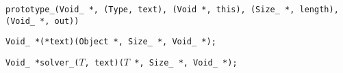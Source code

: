 
\tt{prototype_(Void_ *, (Type, text), (Void *, this), (Size_ *, length), (Void_ *, out))}


\tt{Void_ *(*text)(Object *, Size_ *, Void_ *);}


\tt{Void_ *solver_(}$T$\tt{, text)(}$T$ \tt{*, Size_ *, Void_ *);}

